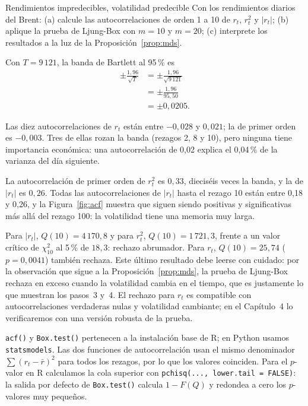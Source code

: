 \begin{ejresuelto}{Rendimientos impredecibles, volatilidad predecible}\label{ej:acf}
\enunciado Con los rendimientos diarios del Brent: (a) calcule las autocorrelaciones de orden 1 a 10 de
$r_t$, $r_t^2$ y $|r_t|$; (b) aplique la prueba de Ljung-Box con $m=10$ y $m=20$; (c) interprete los
resultados a la luz de la Proposición~\ref{prop:mds}.

\solucion
{} Con $T=9\,121$, la banda de Bartlett al 95\,\% es
\begin{align*}
  \pm\frac{1{,}96}{\sqrt T} &= \pm\frac{1{,}96}{\sqrt{9\,121}}\\
                            &= \pm\frac{1{,}96}{95{,}50}\\
                            &= \pm0{,}0205 .
\end{align*}

 Las diez autocorrelaciones de $r_t$ están entre $-0{,}028$ y $0{,}021$;
la de primer orden es $-0{,}003$. Tres de ellas rozan la banda (rezagos 2, 8 y 10), pero ninguna tiene
importancia económica: una autocorrelación de 0,02 explica el 0,04\,\% de la varianza del día siguiente.

 La autocorrelación de primer orden de $r_t^2$ es $0{,}33$,
dieciséis veces la banda, y la de $|r_t|$ es $0{,}26$. Todas las autocorrelaciones de $|r_t|$ hasta el
rezago 10 están entre 0,18 y 0,26, y la Figura~\ref{fig:acf} muestra que siguen siendo positivas y
significativas más allá del rezago 100: la volatilidad tiene una memoria muy larga.

 Para $|r_t|$, $Q(10)=4\,170{,}8$ y para $r_t^2$, $Q(10)=1\,721{,}3$, frente a un
valor crítico de $\chi^2_{10}$ al 5\,\% de $18{,}3$: rechazo abrumador. Para $r_t$, $Q(10)=25{,}74$
($p=0{,}0041$) también rechaza. Este último resultado debe leerse con cuidado: por la observación que
sigue a la Proposición~\ref{prop:mds}, la prueba de Ljung-Box rechaza en exceso cuando la volatilidad
cambia en el tiempo, que es justamente lo que muestran los pasos~3 y~4. El rechazo para $r_t$ es
compatible con autocorrelaciones verdaderas nulas y volatilidad cambiante; en el Capítulo~4 lo
verificaremos con una versión robusta de la prueba.


\RvsPy \texttt{acf()} y \texttt{Box.test()} pertenecen a la instalación base de R; en Python usamos
\texttt{statsmodels}. Las dos funciones de autocorrelación usan el mismo denominador $\sum(r_t-\bar r)^2$
para todos los rezagos, por lo que los valores coinciden. Para el $p$-valor en R calculamos la cola
superior con \texttt{pchisq(..., lower.tail = FALSE)}: la salida por defecto de \texttt{Box.test()}
calcula $1-F(Q)$ y redondea a cero los $p$-valores muy pequeños.


\end{ejresuelto}
